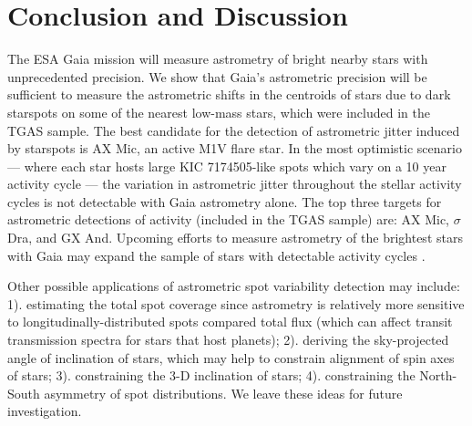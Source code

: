 \section{Conclusion and Discussion}

The ESA Gaia mission will measure astrometry of bright nearby stars with unprecedented precision. We show that Gaia's astrometric precision will be sufficient to measure the astrometric shifts in the centroids of stars due to dark starspots on some of the nearest low-mass stars, which were included in the TGAS sample. The best candidate for the detection of astrometric jitter induced by starspots is AX Mic, an active M1V flare star. In the most optimistic scenario --- where each star hosts large KIC 7174505-like spots which vary on a 10 year activity cycle --- the variation in astrometric jitter throughout the stellar activity cycles is not detectable with Gaia astrometry alone. The top three targets for astrometric detections of activity (included in the TGAS sample) are: AX Mic, $\sigma$ Dra, and GX And. Upcoming efforts to measure astrometry of the brightest stars with Gaia may expand the sample of stars with detectable activity cycles \citep{Martin-Fleitas2014, Sahlmann2016}.

Other possible applications of astrometric spot variability detection
may include: 1). estimating the total spot coverage since astrometry
is relatively more sensitive to longitudinally-distributed spots compared
total flux (which can affect transit transmission spectra for stars
that host planets); 2). deriving the sky-projected angle of inclination
of stars, which may help to constrain alignment of spin axes of stars; 
3). constraining the 3-D inclination of stars; 4). constraining the North-South asymmetry of spot distributions.  We leave
these ideas for future investigation.





